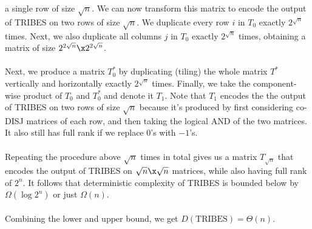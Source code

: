 \documentclass{article}
\begin{document}
\begin{enumerate}
\begin{enumerate}[label=(\alph*)]
                a single row of size $\sqrt{n}$. We can now transform this
                matrix to encode the output of TRIBES on two rows of size
                $\sqrt{n}$.  We duplicate every row $i$ in $T_0$ exactly
                $2^{\sqrt{n}}$ times. Next, we also duplicate all columns $j$
                in $T_0$ exactly $2^{\sqrt{n}}$ times, obtaining a matrix of
                size $2^{2\sqrt{n}} \x 2^{2\sqrt{n}}$.
                \\\\
                Next, we produce a matrix $T_0^*$ by duplicating (tiling) the
                whole matrix $T^*$ vertically and horizontally exactly
                $2^{\sqrt{n}}$ times. Finally, we take the component-wise
                product of $T_0$ and $T_0^*$ and denote it $T_1$. Note that
                $T_1$ encodes the the output of TRIBES on two rows of size
                $\sqrt{n}$ because it's produced by first considering co-DISJ
                matrices of each row, and then taking the logical AND of the
                two matrices. It also still has full rank if we replace $0$'s
                with $-1$'s.
                \\\\
                Repeating the procedure above $\sqrt{n}$ times in total gives
                us a matrix $T_{\sqrt{n}}$ that encodes the output of
                TRIBES on $\sqrt{n} \x \sqrt{n}$ matrices, while also having
                full rank of $2^n$. It follows that deterministic complexity of
                TRIBES is bounded below by $\Omega(\log 2^n)$ or  just
                $\Omega(n)$.
                \\\\
                Combining the lower and upper bound, we get
                $D(\textrm{TRIBES}) = \Theta(n)$.
                \\
                

\end{enumerate}
\end{enumerate}
\end{document}
